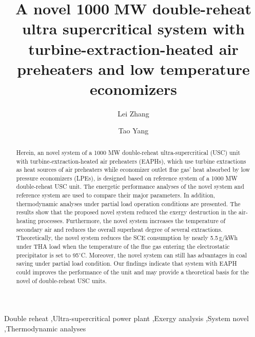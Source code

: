 \documentclass[preprint,12pt]{elsarticle}
\begin{document}
\begin{frontmatter}



\title{A novel 1000\,\,MW double-reheat ultra supercritical system with turbine-extraction-heated air preheaters and low temperature economizers}


\author[hust,ncst]{Lei Zhang}
\author[hust]{Tao Yang}

\address[hust]{School of Energy and Power Engineering, Huazhong University of Science and Technology, Wuhan 430074,China}
\address[ncst]{College of Metallurgy and Energy, NorthChina University of Scienceand and Technology, Tangshan 063009,China}

\begin{abstract}%
Herein, an novel system of a 1000\,\,MW double-reheat ultra-supercritical (USC) unit with turbine-extraction-heated air preheaters (EAPHs), which use turbine extractions as heat sources of air preheaters while economizer outlet flue gas’ heat absorbed by low pressure economizers (LPEs), is designed based on reference system of a 1000\,\,MW double-reheat USC unit. 
The energetic performance analyses of the novel system and reference system are used to compare their major parameters. 
In addition, thermodynamic analyses under partial load operation conditions are presented. 
The results show that the proposed novel system reduced the exergy destruction in the air-heating processes. Furthermore, the novel system increases the temperature of secondary air and reduces the overall superheat degree of several extractions.
 Theoretically, the novel system reduces the SCE consumption by nearly 5.5\,g/kWh under THA load when the temperature of the flue gas entering the electrostatic precipitator is set to 95$^\circ$C.
 Moreover, the novel system can still has advantages in coal saving under partial load condition.
 Our findings indicate that system with EAPH could improves the performance of the unit and may provide a theoretical basis for the novel of double-reheat USC units.
\end{abstract}

\begin{keyword}
Double reheat \sep Ultra-supercritical power plant \sep Exergy analysis \sep System novel \sep Thermodynamic analyses
\end{keyword}

\end{frontmatter}
\end{document}
